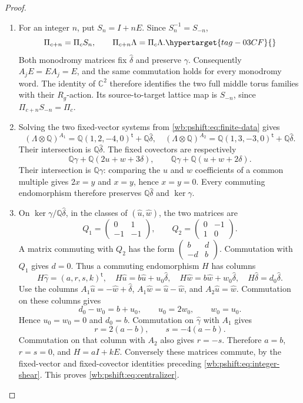 \begin{proof}
\begin{enumerate}[label=\arabic*.,leftmargin=*]
\item For an integer $n$, put $S_n=I+nE$. Since $S_n^{-1}=S_{-n}$,
\begin{equation}
 \Pi_{c+n}=\Pi_c S_n,\qquad
 \Pi_{c+n}\Lambda=\Pi_c\Lambda.
 \hypertarget{tag-03CF}{}\label{wb:pshift:eq:integer-shear}
\end{equation}
Both monodromy matrices fix $\widehat\delta$ and preserve $\gamma$.
Consequently $A_jE=EA_j=E$, and the same commutation holds for every
monodromy word. The identity of $\mathbb C^2$ therefore identifies
the two full middle torus families with their $R_g$-action.
Its source-to-target lattice map is $S_{-n}$, since
$\Pi_{c+n}S_{-n}=\Pi_c$.
\item Solving the two fixed-vector systems from \eqref{wb:pshift:eq:finite-data} gives
\[
 (\Lambda\otimes\mathbb Q)^{A_1}
   =\mathbb Q(1,2,-4,0)^{\mathsf t}+\mathbb Q\widehat\delta,
 \quad
 (\Lambda\otimes\mathbb Q)^{A_2}
   =\mathbb Q(1,3,-3,0)^{\mathsf t}+\mathbb Q\widehat\delta.
\]
Their intersection is $\mathbb Q\widehat\delta$. The fixed covectors
are respectively
\[
 \mathbb Q\gamma+\mathbb Q(2u+w+3\delta),\qquad
 \mathbb Q\gamma+\mathbb Q(u+w+2\delta).
\]
Their intersection is $\mathbb Q\gamma$: comparing the $u$ and $w$
coefficients of a common multiple gives $2x=y$ and $x=y$, hence
$x=y=0$. Every commuting endomorphism therefore preserves
$\mathbb Q\widehat\delta$ and $\ker\gamma$.

\item On $\ker\gamma/\mathbb Q\widehat\delta$, in the classes of
$(\widehat u,\widehat w)$, the two matrices are
\[
 Q_1=\begin{pmatrix}0&1\\-1&-1\end{pmatrix},\qquad
 Q_2=\begin{pmatrix}0&-1\\1&0\end{pmatrix}.
\]
A matrix commuting with $Q_2$ has the form
$\left(\begin{smallmatrix}b&d\\-d&b\end{smallmatrix}\right)$.
Commutation with $Q_1$ gives $d=0$. Thus a commuting endomorphism $H$
has columns
\[
 H\widehat\gamma=(a,r,s,k)^{\mathsf t},\quad
 H\widehat u=b\widehat u+u_0\widehat\delta,\quad
 H\widehat w=b\widehat w+w_0\widehat\delta,\quad
 H\widehat\delta=d_0\widehat\delta.
\]
Use the columns $A_1\widehat u=-\widehat w+\widehat\delta$,
$A_1\widehat w=\widehat u-\widehat w$, and
$A_2\widehat u=\widehat w$. Commutation on these columns gives
\[
 d_0-w_0=b+u_0,\qquad u_0=2w_0,\qquad w_0=u_0.
\]
Hence $u_0=w_0=0$ and $d_0=b$. Commutation on
$\widehat\gamma$ with $A_1$ gives
\[
 r=2(a-b),\qquad s=-4(a-b).
\]
Commutation on that column with $A_2$ also gives $r=-s$.
Therefore $a=b$, $r=s=0$, and $H=aI+kE$. Conversely these matrices
commute, by the fixed-vector and fixed-covector identities preceding
\eqref{wb:pshift:eq:integer-shear}. This proves \eqref{wb:pshift:eq:centralizer}.


\end{enumerate}
\end{proof}
